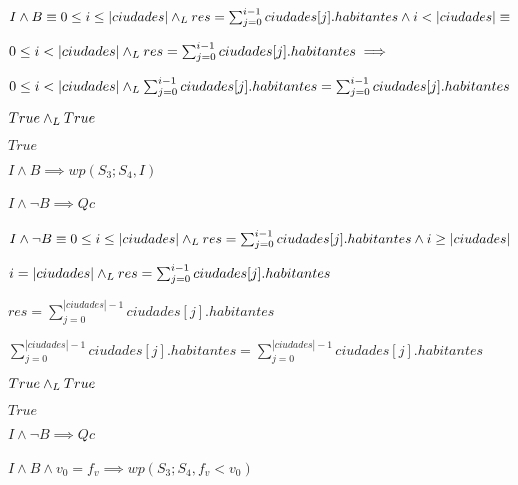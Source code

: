 \documentclass[10pt,a4paper]{article}
\begin{document}
$I \wedge B \equiv 0 \leq i \leq |ciudades| \land _L res = \sum_{j=0}^{i-1} ciudades[j].habitantes \wedge i < |ciudades| \equiv$\par

\begin{center}
$0 \leq i < |ciudades| \land _L res = \sum_{j=0}^{i-1} ciudades[j].habitantes  \implies  $ \par
\vspace{5px}
$ 0 \leq i < |ciudades| \land _L \sum_{j=0}^{i-1} ciudades[j].habitantes = \sum_{j=0}^{i-1} ciudades[j].habitantes$ \equiv \par
\vspace{5px}
$True \land _L True$ \equiv \par
\vspace{5px}
$True$\par
\vspace{5px}
    $I \wedge B \implies wp(S_{3};S_{4}, I)$
\end{center}

\paragraph{$I \wedge \neg B \implies Qc$}
$I \wedge \neg B \equiv 0 \leq i \leq |ciudades| \land _L res = \sum_{j=0}^{i-1} ciudades[j].habitantes \wedge i \geq |ciudades| $ \equiv \par

\begin{center}
  $i = |ciudades| \land _L res = \sum_{j=0}^{i-1} ciudades[j].habitantes$ \equiv \par
\vspace{5px}  
$res = \sum_{j=0}^{|ciudades|-1} ciudades[j].habitantes$ \implies \par
\vspace{5px} 
$\sum_{j=0}^{|ciudades|-1} ciudades[j].habitantes = \sum_{j=0}^{|ciudades|-1} ciudades[j].habitantes$ \equiv \par
\vspace{5px}
$True \land _L True$ \equiv \par
\vspace{5px}
$True$\par
\vspace{5px}
$I \wedge \neg B \implies Qc$
\end{center}

\paragraph{$I \wedge  B \wedge v_{0}=f_{v} \implies wp(S_{3};S_{4}, f_{v} < v_{0})$}
\end{document}
